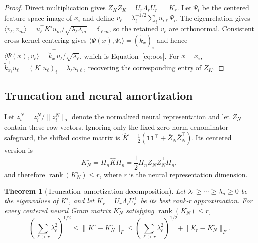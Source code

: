 \documentclass[pdflatex,sn-mathphys-num]{sn-jnl}
\newcommand{\1}{\mathbf{1}}
\theoremstyle{plain}
\newtheorem{theorem}{Theorem}
\begin{document}
	\begin{proof}
		Direct multiplication gives $Z_KZ_K^\top=U_r\Lambda_rU_r^\top=K_r$. Let $\Psi_i$ be the centered feature-space image of $x_i$ and define $v_\ell=\lambda_\ell^{-1/2}\sum_i u_{i\ell}\Psi_i$. The eigenrelation gives $\langle v_\ell,v_m\rangle=u_\ell^\top K^\circ u_m/\sqrt{\lambda_\ell\lambda_m}=\delta_{\ell m}$, so the retained $v_\ell$ are orthonormal. Consistent cross-kernel centering gives $\langle\Psi(x),\Psi_i\rangle=(\widetilde k_x)_i$ and hence $\langle\Psi(x),v_\ell\rangle=\widetilde k_x^\top u_\ell/\sqrt{\lambda_\ell}$, which is Equation~\eqref{eq:oos}. For $x=x_i$, $\widetilde k_{x_i}^\top u_\ell=(K^\circ u_\ell)_i=\lambda_\ell u_{i\ell}$, recovering the corresponding entry of $Z_K$.
	\end{proof}
	
	\subsection{Truncation and neural amortization}
	
	Let $\overline z_i^N=z_i^N/\|z_i^N\|_2$ denote the normalized neural
	representation and let $\overline Z_N$ contain these row vectors.
	Ignoring only the fixed zero-norm denominator safeguard, the shifted cosine matrix is $\widehat K=\tfrac12(\mathbf{1}\mathbf{1}^\top+\overline Z_N\overline Z_N^\top)$.
	Its centered version is
	\begin{equation}
		K_N^\circ
		=
		H_n\widehat KH_n
		=
		\frac{1}{2}
		H_n\overline Z_N\overline Z_N^\top H_n,
		\label{eq:centered_neural_gram}
	\end{equation}
	and therefore $\operatorname{rank}(K_N^\circ)\leq r$, where $r$ is the neural representation dimension.
	
	\begin{theorem}[Truncation--amortization decomposition]
		\label{thm:decomp}
		Let $\lambda_1\geq\cdots\geq\lambda_n\geq0$ be the eigenvalues of $K^\circ$, and let $K_r=U_r\Lambda_rU_r^\top$ be its best rank-$r$ approximation. For every centered neural Gram
		matrix $K_N^\circ$ satisfying
		$\operatorname{rank}(K_N^\circ)\leq r$,
		\begin{equation}
			\left(
			\sum_{\ell>r}\lambda_\ell^2
			\right)^{1/2}
			\leq
			\|K^\circ-K_N^\circ\|_F
			\leq
			\left(
			\sum_{\ell>r}\lambda_\ell^2
			\right)^{1/2}
			+
			\|K_r-K_N^\circ\|_F.
			\label{eq:twoerror}
		\end{equation}
	\end{theorem}
	
\end{document}
